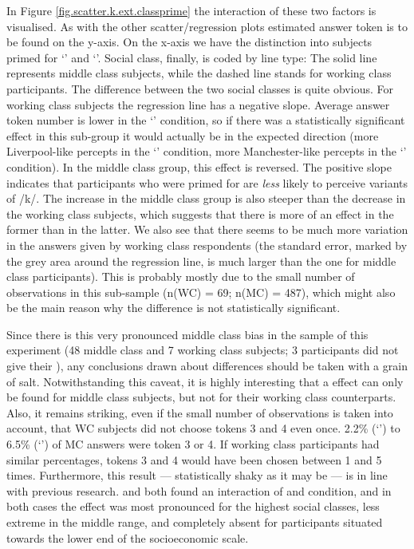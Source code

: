 In Figure \ref{fig.scatter.k.ext.classprime} the interaction of these two factors is visualised.
As with the other scatter/regression plots estimated answer token is to be found on the y-axis.
On the x-axis we have the distinction into subjects primed for `' and `'.
Social class, finally, is coded by line type: The solid line represents middle class subjects, while the dashed line stands for working class participants.
The difference between the two social classes is quite obvious.
For working class subjects the regression line has a negative slope.
Average answer token number is lower in the `' condition, so if there was a statistically significant  effect in this sub-group it would actually be in the expected direction (more Liverpool-like percepts in the `' condition, more Manchester-like percepts in the `' condition).
In the middle class group, this effect is reversed.
The positive slope indicates that participants who were primed for  are \emph{less} likely to perceive  variants of /k/.
The increase in the middle class group is also steeper than the decrease in the working class subjects, which suggests that there is more of an effect in the former than in the latter.
We also see that there seems to be much more variation in the answers given by working class respondents (the standard error, marked by the grey area around the regression line, is much larger than the one for middle class participants).
This is probably mostly due to the small number of observations in this sub-sample (n(WC) = 69; n(MC) = 487), which might also be the main reason why the difference is not statistically significant.

Since there is this very pronounced middle class bias in the sample of this experiment (48 middle class and 7 working class subjects; 3 participants did not give their ), any conclusions drawn about  differences should be taken with a grain of salt.
Notwithstanding this caveat, it is highly interesting that a  effect can only be found for middle class subjects, but not for their working class counterparts.
Also, it remains striking, even if the small number of observations is taken into account, that WC subjects did not choose tokens 3 and 4 even once.
2.2\% (`') to 6.5\% (`') of MC answers were token 3 or 4.
If working class participants had similar percentages, tokens 3 and 4 would have been chosen between 1 and 5 times.
Furthermore, this result --- statistically shaky as it may be --- is in line with previous research.
\textcite{hayetal2006a} and \textcite{haydrager2010} both found an interaction of  and condition, and in both cases the  effect was most pronounced for the highest social classes, less extreme in the middle range, and completely absent for participants situated towards the lower end of the socioeconomic scale.

